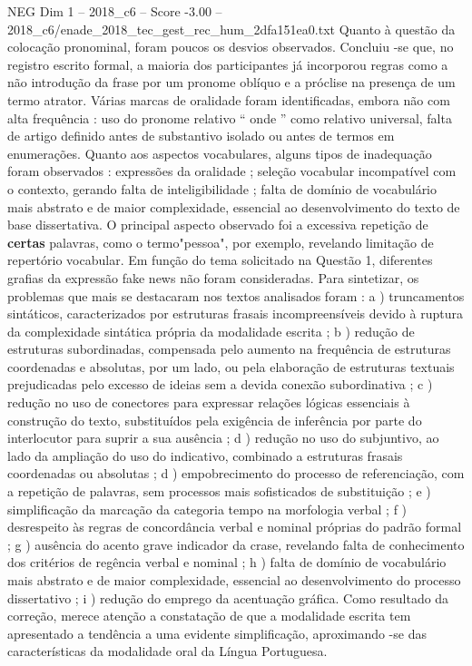 \begin{textsample}{NEG Dim 1 – 2018\_c6 – Score -3.00 – 2018\_c6/enade\_2018\_tec\_gest\_rec\_hum\_2dfa151ea0.txt}
Quanto à questão da colocação pronominal, foram poucos os desvios observados.
Concluiu -se que, no registro escrito formal, a maioria dos participantes já incorporou regras como a não introdução da frase por um pronome oblíquo e a próclise na presença de um termo atrator.
Várias marcas de oralidade foram identificadas, embora não com alta frequência : uso do pronome relativo “ onde ” como relativo universal, falta de artigo definido antes de substantivo isolado ou antes de termos em enumerações.
Quanto aos aspectos vocabulares, alguns tipos de inadequação foram observados : expressões da oralidade ; seleção vocabular incompatível com o contexto, gerando falta de inteligibilidade ; falta de domínio de vocabulário mais abstrato e de maior complexidade, essencial ao desenvolvimento do texto de base dissertativa.
O principal aspecto observado foi a excessiva repetição de \textbf{certas} palavras, como o termo"pessoa", por exemplo, revelando limitação de repertório vocabular.
Em função do tema solicitado na Questão 1, diferentes grafias da expressão fake news não foram consideradas.
Para sintetizar, os problemas que mais se destacaram nos textos analisados foram : a ) truncamentos sintáticos, caracterizados por estruturas frasais incompreensíveis devido à ruptura da complexidade sintática própria da modalidade escrita ; b ) redução de estruturas subordinadas, compensada pelo aumento na frequência de estruturas coordenadas e absolutas, por um lado, ou pela elaboração de estruturas textuais prejudicadas pelo excesso de ideias sem a devida conexão subordinativa ; c ) redução no uso de conectores para expressar relações lógicas essenciais à construção do texto, substituídos pela exigência de inferência por parte do interlocutor para suprir a sua ausência ; d ) redução no uso do subjuntivo, ao lado da ampliação do uso do indicativo, combinado a estruturas frasais coordenadas ou absolutas ; d ) empobrecimento do processo de referenciação, com a repetição de palavras, sem processos mais sofisticados de substituição ; e ) simplificação da marcação da categoria tempo na morfologia verbal ; f ) desrespeito às regras de concordância verbal e nominal próprias do padrão formal ; g ) ausência do acento grave indicador da crase, revelando falta de conhecimento dos critérios de regência verbal e nominal ; h ) falta de domínio de vocabulário mais abstrato e de maior complexidade, essencial ao desenvolvimento do processo dissertativo ; i ) redução do emprego da acentuação gráfica.
Como resultado da correção, merece atenção a constatação de que a modalidade escrita tem apresentado a tendência a uma evidente simplificação, aproximando -se das características da modalidade oral da Língua Portuguesa.

\end{textsample}
